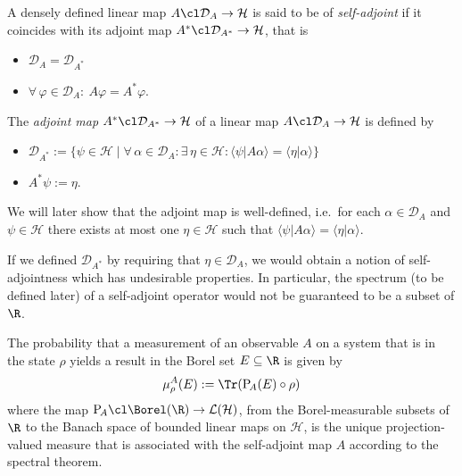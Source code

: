     \begin{definition}
        A densely defined linear map $A\cl\mathcal{D}_A\to \mathcal{H}$ is said to be of \emph{self-adjoint} if it coincides with its adjoint map $A^*\cl\mathcal{D}_{A^*}\to \mathcal{H}$, that is
        \begin{itemize}
            \item $\mathcal{D}_A=\mathcal{D}_{A^*}$
            \item $\forall \, \varphi\in\mathcal{D}_A : \ A\varphi=A^*\varphi$.
        \end{itemize}
    \end{definition}
    \begin{definition}
        The \emph{adjoint map} $A^*\cl\mathcal{D}_{A^*}\to \mathcal{H}$ of a linear map $A\cl\mathcal{D}_A\to \mathcal{H}$ is defined by
        \begin{itemize}
            \item $\mathcal{D}_{A^*}:=\{\psi\in\mathcal{H}\mid \forall \, \alpha \in \mathcal{D}_A:\exists \, \eta \in \mathcal{H} : \langle\psi|A\alpha\rangle=\langle\eta|\alpha\rangle\}$
            \item $A^*\psi:=\eta$.
        \end{itemize}
    \end{definition}
    We will later show that the adjoint map is well-defined, i.e.\ for each $\alpha\in\mathcal{D}_A$ and $\psi\in\mathcal{H}$ there exists at most one $\eta\in\mathcal{H}$ such that $\langle\psi|A\alpha\rangle = \langle\eta|\alpha\rangle$.

    \begin{remark}
        If we defined $\mathcal{D}_{A^*}$ by requiring that $\eta\in \mathcal{D}_{A}$, we would obtain a notion of self-adjointness which has undesirable properties. In particular, the spectrum (to be defined later) of a self-adjoint operator would not be guaranteed to be a subset of $\R$.
    \end{remark}

    \begin{tcolorbox}[colframe=blue!10!black]
        \begin{axiom}[Measurement]
            The probability that a measurement of an observable $A$ on a system that is in the state $\rho$ yields a result in the Borel set $E\subseteq \R$ is given by
            \begin{equation*}
                \mu^A_\rho(E):=\Tr(\mathrm{P}_{\!A}(E)\circ\rho)
            \end{equation*}
            where the map $\mathrm{P}_{\!A}\cl \Borel(\R)\to\mathcal{L}(\mathcal{H})$, from the Borel-measurable subsets of $\R$ to the Banach space of bounded linear maps on $\mathcal{H}$, is the unique projection-valued measure that is associated with the self-adjoint map $A$ according to the spectral theorem.
        \end{axiom}
    \end{tcolorbox}

